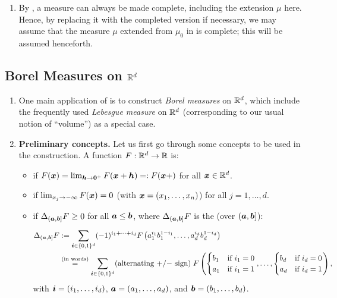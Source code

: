 \begin{enumerate}
\item \label{it:meas-complete-wlog} By , a measure can
always be made complete, including the extension \(\mu\) here. Hence, by
replacing it with the completed version if necessary, we may assume that the
measure \(\mu\) extended from \(\mu_0\) in  is complete;
this will be assumed henceforth.
\end{enumerate}
\subsection{Borel Measures on \(\mathbb{R}^d\)}
\label{subsect:borel-meas-rd}
\begin{enumerate}
\item One main application of  is to construct
\emph{Borel measures} on \(\mathbb{R}^d\), which include the frequently used
\emph{Lebesgue measure} on \(\mathbb{R}^d\) (corresponding to our usual notion of
``volume'') as a special case.

\item \textbf{Preliminary concepts.} Let us first go through some concepts to
be used in the construction. A function \(F:\mathbb{R}^d\to\mathbb{R}\) is:
\begin{itemize}
\item {} if \(F(\bm{x})=\lim_{\bm{h}\to
\bm{0}^{+}}F(\bm{x}+\bm{h})=:F(\bm{x}+)\) for all \(\bm{x}\in\mathbb{R}^d\).
\item {} if \(\lim_{x_j\to -\infty}F(\bm{x})=0\) (with
\(\bm{x}=(x_1,\dotsc,x_n)\)) for all \(j=1,\dotsc,d\).
\item {} if \(\Delta_{(\bm{a},\bm{b}]}F\ge 0\) for all
\(\bm{a}\le\bm{b}\), where \(\Delta_{(\bm{a},\bm{b}]}F\) is the
 (over \((\bm{a},\bm{b}]\)):
\begin{align*}
\Delta_{(\bm{a},\bm{b}]}F&:=
\sum_{\bm{i}\in\{0,1\}^{d}}^{}(-1)^{i_{1}+\dotsb+i_{d}}
F\left(a_1^{i_1}b_1^{1-i_1},\dotsc,a_{d}^{i_d}b_{d}^{1-i_{d}}\right) \\
&\overset{\text{(in words)}}{=}
\sum_{\bm{i}\in\{0,1\}^{d}}^{}
(\text{alternating \(+\)/\(-\) sign})\;
F\left(
\begin{cases}
b_1&\text{if \(i_1=0\)} \\
a_1&\text{if \(i_1=1\)}
\end{cases}
,\dotsc,
\begin{cases}
b_d&\text{if \(i_d=0\)} \\
a_d&\text{if \(i_d=1\)}
\end{cases}
\right),
\end{align*}
with \(\bm{i}=(i_1,\dotsc,i_d)\), \(\bm{a}=(a_1,\dotsc,a_d)\), and
\(\bm{b}=(b_1,\dotsc,b_d)\).


\end{itemize}
\end{enumerate}
